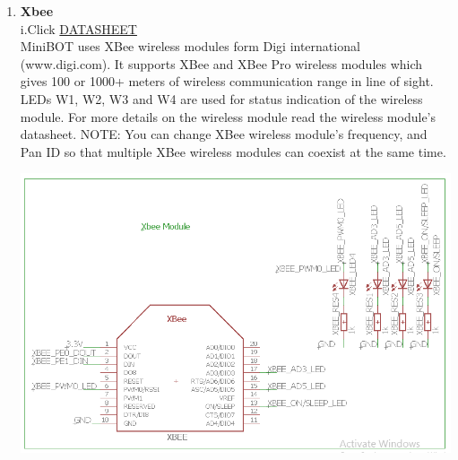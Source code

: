 \documentclass[a4paper,12pt,oneside]{book}
\begin{document}
\begin{enumerate}
    \newpage\item \textbf{Xbee}\\
    i.Click \href{https://www.digi.com/pdf/ds_xbeemultipointmodules.pdf}{DATASHEET}
    \\[0.5cm]MiniBOT uses XBee wireless modules form Digi international (www.digi.com). It supports XBee and XBee Pro wireless modules which gives 100 or 1000+ meters of wireless communication range in line of sight.
    LEDs W1, W2, W3 and W4 are used for status indication of the wireless module. For more details on the wireless module read the wireless module’s datasheet.
    NOTE:
    You can change XBee wireless module’s frequency, and Pan ID so that multiple XBee wireless modules can coexist at the same time. 
    \vspace*{1.5cm}
    \\\hfill\includegraphics[width=13cm, height=9cm]{Xbee}
    

\end{enumerate}
\end{document}
